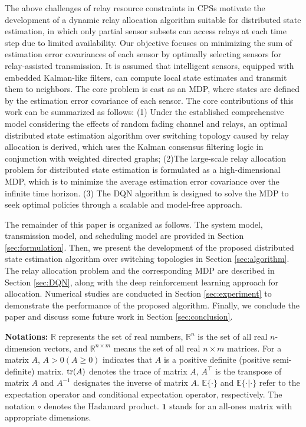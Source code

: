\documentclass[twocolumn]{IEEEtran}
\newcommand{\tr}{{\rm tr}}
\begin{document}
The above challenges of relay resource constraints in CPSs motivate the development of a dynamic relay allocation algorithm suitable for distributed state estimation, in which only partial sensor subsets can access relays at each time step due to limited availability. Our objective focuses on minimizing the sum of estimation error covariances of each sensor by optimally selecting sensors for relay-assisted transmission. It is assumed that intelligent sensors, equipped with embedded Kalman-like filters, can compute local state estimates and transmit them to neighbors. The core problem is cast as an MDP, where states are defined by the estimation error covariance of each sensor. The core contributions of this work can be summarized as follows: (1) Under the established comprehensive model considering the effects of random fading channel and relays, an optimal distributed state estimation algorithm over switching topology caused by relay allocation is derived, which uses the Kalman consensus filtering logic in conjunction with weighted directed graphs; (2)The large-scale relay allocation problem for distributed state estimation is formulated as a high-dimensional MDP, which is to minimize the average estimation error covariance over the infinite time horizon.
(3) The DQN algorithm is designed to solve the MDP to seek optimal policies through a scalable and model-free approach.

The remainder of this paper is organized as follows. The system model, transmission model, and scheduling model are provided in Section \ref{sec:formulation}. Then, we present the development of the proposed distributed state estimation algorithm over switching topologies in Section \ref{sec:algorithm}. The relay allocation problem and the corresponding MDP are described in Section \ref{sec:DQN}, along with the deep reinforcement learning approach for allocation. Numerical studies are conducted in Section \ref{sec:experiment} to demonstrate the performance of the proposed algorithm. Finally, we conclude the paper and discuss some future work in Section \ref{sec:conclusion}.

{\bf Notations:}
$\mathbb{R}$ represents the set of real numbers, $\mathbb{R}^n$ is the set of all real $n$-dimension vectors, and $\mathbb{R}^{n\times m}$ means the set of all real $n\times m$ matrices. For a matrix $A$, $A > 0(A \geq 0)$ indicates that $A$ is a positive definite (positive semi-definite) matrix. $\tr(A)$ denotes the trace of matrix $A$, $A^{\top}$ is the transpose of matrix $A$ and $A^{-1}$ designates the inverse of matrix $A$. $\mathbb{E}\{\cdot\}$ and $\mathbb{E}\{\cdot|\cdot\}$ refer to the expectation operator and conditional expectation operator, respectively. The notation $\circ$ denotes the Hadamard product. $\mathbf{1}$ stands for an all-ones matrix with appropriate dimensions.
\end{document}
